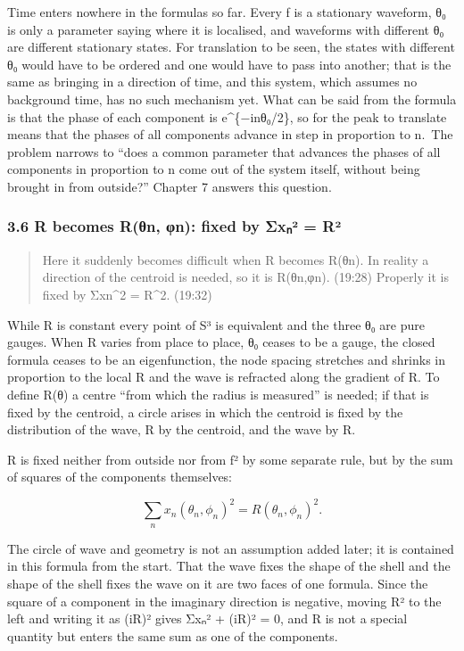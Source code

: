 \documentclass[
  a4paper,
]{article}
\begin{document}
Time enters nowhere in the formulas so far. Every f is a stationary
waveform, θ₀ is only a parameter saying where it is localised, and
waveforms with different θ₀ are different stationary states. For
translation to be seen, the states with different θ₀ would have to be
ordered and one would have to pass into another; that is the same as
bringing in a direction of time, and this system, which assumes no
background time, has no such mechanism yet. What can be said from the
formula is that the phase of each component is e\^{}\{−inθ₀/2\}, so for
the peak to translate means that the phases of all components advance in
step in proportion to n.~The problem narrows to ``does a common
parameter that advances the phases of all components in proportion to n
come out of the system itself, without being brought in from outside?''
Chapter 7 answers this question.

\subsubsection{3.6 R becomes R(θn, φn): fixed by Σxₙ² =
R²}\label{r-becomes-rux3b8n-ux3c6n-fixed-by-ux3c3xux2099uxb2-ruxb2}

\begin{quote}
Here it suddenly becomes difficult when R becomes R(θn). In reality a
direction of the centroid is needed, so it is R(θn,φn). (19:28) Properly
it is fixed by Σxn\^{}2 = R\^{}2. (19:32)
\end{quote}

While R is constant every point of S³ is equivalent and the three θ₀ are
pure gauges. When R varies from place to place, θ₀ ceases to be a gauge,
the closed formula ceases to be an eigenfunction, the node spacing
stretches and shrinks in proportion to the local R and the wave is
refracted along the gradient of R. To define R(θ) a centre ``from which
the radius is measured'' is needed; if that is fixed by the centroid, a
circle arises in which the centroid is fixed by the distribution of the
wave, R by the centroid, and the wave by R.

R is fixed neither from outside nor from \textbar f\textbar² by some
separate rule, but by the sum of squares of the components themselves:

\[
\sum_n x_n(\theta_n,\phi_n)^2=R(\theta_n,\phi_n)^2 .
\]

The circle of wave and geometry is not an assumption added later; it is
contained in this formula from the start. That the wave fixes the shape
of the shell and the shape of the shell fixes the wave on it are two
faces of one formula. Since the square of a component in the imaginary
direction is negative, moving R² to the left and writing it as (iR)²
gives Σxₙ² + (iR)² = 0, and R is not a special quantity but enters the
same sum as one of the components.
\end{document}
